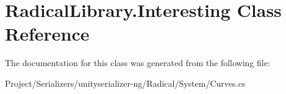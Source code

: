 \hypertarget{class_radical_library_1_1_interesting}{}\section{Radical\+Library.\+Interesting Class Reference}
\label{class_radical_library_1_1_interesting}


The documentation for this class was generated from the following file\+:\begin{DoxyCompactItemize}
\item 
Project/\+Serializers/unityserializer-\/ng/\+Radical/\+System/Curves.\+cs\end{DoxyCompactItemize}
